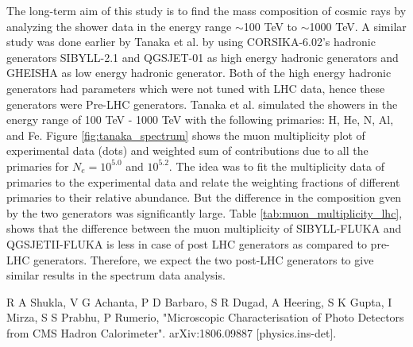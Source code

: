 \documentclass[12pt]{article}
\begin{document}
The long-term aim of this study is to find the mass composition of cosmic rays
by analyzing the shower data in the energy range $\sim$100 TeV to $\sim$1000
TeV. A similar study was done earlier by Tanaka et al. by using CORSIKA-6.02's
hadronic generators SIBYLL-2.1 and QGSJET-01 as high energy hadronic generators
and GHEISHA as low energy hadronic generator. Both of the high energy hadronic
generators had parameters which were not tuned with LHC data, hence these
generators were Pre-LHC generators. Tanaka et al. simulated the showers in the
energy range of 100 TeV - 1000 TeV with the following primaries: H, He, N, Al,
and Fe. Figure \ref{fig:tanaka_spectrum} shows the muon multiplicity plot of
experimental data (dots) and weighted sum of contributions due to all the
primaries for $N_e = 10^{5.0}$ and $10^{5.2}$. The idea was to fit the
multiplicity data of primaries to the experimental data and relate the
weighting fractions of different primaries to their relative abundance. But the
difference in the composition gven by the two generators was significantly
large. Table \ref{tab:muon_multiplicity_lhc}, shows that the difference between
the muon multiplicity of SIBYLL-FLUKA and QGSJETII-FLUKA is less in case of
post LHC generators as compared to pre-LHC generators. Therefore, we expect the
two post-LHC generators to give similar results in the spectrum data analysis.
\linebreak




\begin{thebibliography}{9}
 
 R A Shukla, V G Achanta, P D Barbaro, S R Dugad, A Heering, S K Gupta, I Mirza, S S Prabhu, P Rumerio, "Microscopic Characterisation of Photo Detectors from CMS Hadron Calorimeter".
arXiv:1806.09887 [physics.ins-det].
  
\end{thebibliography}

 
\end{document}
